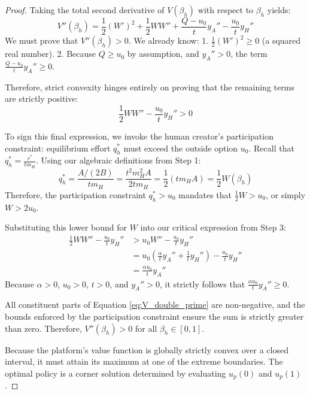 \documentclass[mnsc,nonblindrev]{informs3_NoOR}
\begin{document}
\begin{proof}
Taking the total second derivative of $V(\beta_h)$ with respect to $\beta_h$ yields:
\begin{equation}
V''(\beta_h) = \frac{1}{2} (W')^2 + \frac{1}{2} W W'' + \frac{Q-u_0}{t} y_A'' - \frac{u_0}{t} y_H'' \label{eq:V_double_prime}
\end{equation}
We must prove that $V''(\beta_h) > 0$. We already know:
1. $\frac{1}{2} (W')^2 \ge 0$ (a squared real number).
2. Because $Q \ge u_0$ by assumption, and $y_A'' > 0$, the term $\frac{Q-u_0}{t} y_A'' \ge 0$.

Therefore, strict convexity hinges entirely on proving that the remaining terms are strictly positive:
\begin{equation}
\frac{1}{2} W W'' - \frac{u_0}{t} y_H'' > 0
\end{equation}

To sign this final expression, we invoke the human creator's participation constraint: equilibrium effort $q_h^*$ must exceed the outside option $u_0$. 
Recall that $q_h^* = \frac{r^*}{t m_H}$. Using our algebraic definitions from Step 1:
\begin{equation*}
q_h^* = \frac{A / (2B)}{t m_H} = \frac{t^2 m_H^2 A}{2 t m_H} = \frac{1}{2} (t m_H A) = \frac{1}{2} W(\beta_h)
\end{equation*}
Therefore, the participation constraint $q_h^* > u_0$ mandates that $\frac{1}{2}W > u_0$, or simply $W > 2u_0$. 

Substituting this lower bound for $W$ into our critical expression from Step 3:
\begin{align*}
\frac{1}{2} W W'' - \frac{u_0}{t} y_H'' &> u_0 W'' - \frac{u_0}{t} y_H'' \\
&= u_0 \left( \frac{\alpha}{t} y_A'' + \frac{1}{t} y_H'' \right) - \frac{u_0}{t} y_H'' \\
&= \frac{\alpha u_0}{t} y_A''
\end{align*}
Because $\alpha > 0$, $u_0 > 0$, $t > 0$, and $y_A'' > 0$, it strictly follows that $\frac{\alpha u_0}{t} y_A'' \ge 0$.


All constituent parts of Equation \eqref{eq:V_double_prime} are non-negative, and the bounds enforced by the participation constraint ensure the sum is strictly greater than zero. Therefore, $V''(\beta_h) > 0$ for all $\beta_h \in [0,1]$. 

Because the platform's value function is globally strictly convex over a closed interval, it must attain its maximum at one of the extreme boundaries. The optimal policy is a corner solution determined by evaluating $u_p(0)$ and $u_p(1)$. 



\end{proof}
\end{document}
